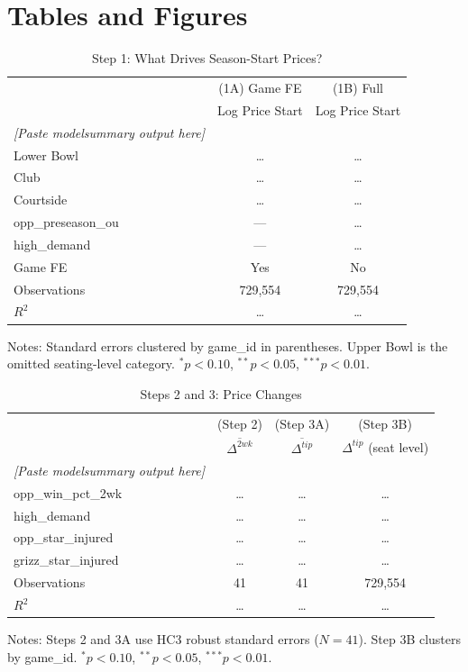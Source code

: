 \documentclass[12pt]{article}
\begin{document}
\section*{Tables and Figures}
 
\begin{table}[H]
\centering
\caption{Step 1: What Drives Season-Start Prices?}
\label{tab:step1}
\small
\begin{tabular}{lcc}
\toprule
 & (1A) Game FE & (1B) Full \\
 & Log Price Start & Log Price Start \\
\midrule
\textit{[Paste modelsummary output here]} & & \\
Lower Bowl     & \ldots & \ldots \\
Club           & \ldots & \ldots \\
Courtside      & \ldots & \ldots \\
opp\_preseason\_ou & --- & \ldots \\
high\_demand   & --- & \ldots \\
\midrule
Game FE        & Yes & No \\
Observations   & 729,554 & 729,554 \\
$R^2$          & \ldots & \ldots \\
\bottomrule
\end{tabular}
\begin{flushleft}
\footnotesize Notes: Standard errors clustered by game\_id in parentheses. Upper Bowl is
the omitted seating-level category. $^{*}p<0.10$, $^{**}p<0.05$, $^{***}p<0.01$.
\end{flushleft}
\end{table}
 
\begin{table}[H]
\centering
\caption{Steps 2 and 3: Price Changes}
\label{tab:steps23}
\small
\begin{tabular}{lccc}
\toprule
 & (Step 2) & (Step 3A) & (Step 3B) \\
 & $\overline{\Delta^{2wk}}$ & $\overline{\Delta^{tip}}$ & $\Delta^{tip}$ (seat level) \\
\midrule
\textit{[Paste modelsummary output here]} & & & \\
opp\_win\_pct\_2wk & \ldots & \ldots & \ldots \\
high\_demand       & \ldots & \ldots & \ldots \\
opp\_star\_injured & \ldots & \ldots & \ldots \\
grizz\_star\_injured & \ldots & \ldots & \ldots \\
\midrule
Observations & 41 & 41 & 729,554 \\
$R^2$ & \ldots & \ldots & \ldots \\
\bottomrule
\end{tabular}
\begin{flushleft}
\footnotesize Notes: Steps 2 and 3A use HC3 robust standard errors ($N=41$).
Step 3B clusters by game\_id. $^{*}p<0.10$, $^{**}p<0.05$, $^{***}p<0.01$.
\end{flushleft}
\end{table}
 
\end{document}
